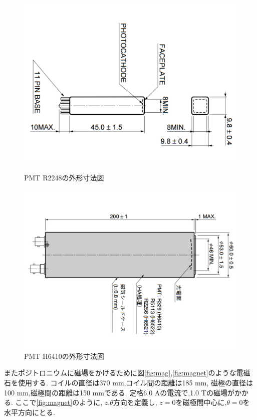 \begin{figure}[htbp]
\begin{minipage}{0.5\hsize}
\centering
\includegraphics[keepaspectratio,angle=90,scale=0.4]{fig/ybm/pmtmini.pdf}
	\caption{PMT R2248の外形寸法図\cite{pmtshape}}
\label{fig:pmtmini}
\end{minipage}
\begin{minipage}{0.5\hsize}
\centering
\includegraphics[keepaspectratio,angle=90,scale=0.4]{fig/ybm/pmtbig.pdf}
	\caption{PMT H6410の外形寸法図\cite{pmtshape}}
\label{fig:pmtbig}
\end{minipage}
\end{figure}

またポジトロニウムに磁場をかけるために図\ref{fig:mag},\ref{fig:magnet}のような電磁石を使用する.
コイルの直径は370 mm,コイル間の距離は185 mm,
磁極の直径は100 mm,磁極間の距離は150 mmである.
定格6.0 Aの電流で,1.0 Tの磁場がかかる.
ここで\ref{fig:magnet}のように,
$z$,$\theta$方向を定義し,
$z=0$を磁極間中心に,$\theta=0$を水平方向にとる.

